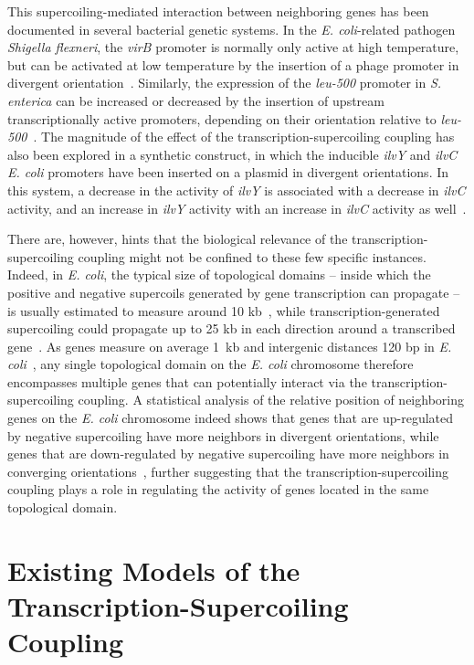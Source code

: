 This supercoiling-mediated interaction between neighboring genes has been documented in several bacterial genetic systems.
In the \emph{E. coli}-related pathogen \emph{Shigella flexneri}, the \emph{virB} promoter is normally only active at high temperature, but can be activated at low temperature by the insertion of a phage promoter in divergent orientation~\citep{tobe1995}.
Similarly, the expression of the \emph{leu-500} promoter in \emph{S. enterica} can be increased or decreased by the insertion of upstream transcriptionally active promoters, depending on their orientation relative to \emph{leu-500}~\citep{elhanafi2000}.
The magnitude of the effect of the transcription-supercoiling coupling has also been explored in a synthetic construct, in which the inducible \emph{ilvY} and \emph{ilvC} \emph{E. coli} promoters have been inserted on a plasmid in divergent orientations.
In this system, a decrease in the activity of \emph{ilvY} is associated with a decrease in \emph{ilvC} activity, and an increase in \emph{ilvY} activity with an increase in \emph{ilvC} activity as well~\citep{rhee1999}.

There are, however, hints that the biological relevance of the transcription-supercoiling coupling might not be confined to these few specific instances.
Indeed, in \emph{E. coli}, the typical size of topological domains --  inside which the positive and negative supercoils generated by gene transcription can propagate -- is usually estimated to measure around 10 kb~\citep{postow2004}, while transcription-generated supercoiling could propagate up to 25 kb in each direction around a transcribed gene~\citep{visser2022}.
As genes measure on average 1~kb and intergenic distances 120 bp in \emph{E. coli}~\citep{blattner1997}, any single topological domain  on the \emph{E. coli} chromosome therefore encompasses multiple genes that can potentially interact via the transcription-supercoiling coupling.
A statistical analysis of the relative position of neighboring genes on the \emph{E. coli} chromosome indeed shows that genes that are up-regulated by negative supercoiling have more neighbors in divergent orientations, while genes that are down-regulated by negative supercoiling have more neighbors in converging orientations~\citep{sobetzko2016}, further suggesting that the transcription-supercoiling coupling plays a role in regulating the activity of genes located in the same topological domain.


\section{Existing Models of the Transcription-Supercoiling Coupling}

